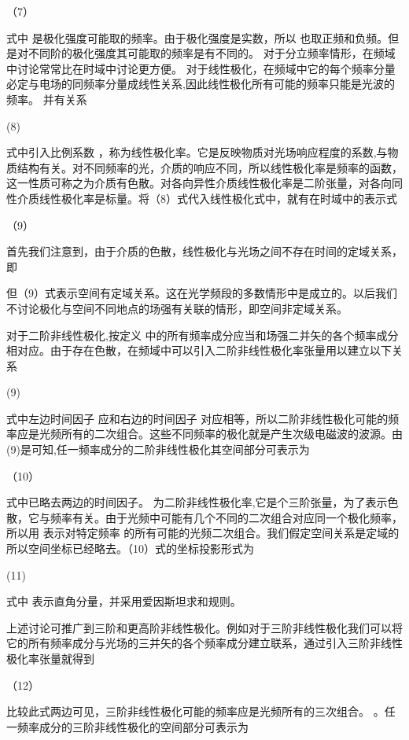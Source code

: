                  （7）

式中 是极化强度可能取的频率。由于极化强度是实数，所以 也取正频和负频。但是对不同阶的极化强度其可能取的频率是有不同的。
      对于分立频率情形，在频域中讨论常常比在时域中讨论更方便。
对于线性极化，在频域中它的每个频率分量必定与电场的同频率分量成线性关系,因此线性极化所有可能的频率只能是光波的频率。 并有关系

                          (8)                 

式中引入比例系数 ，称为线性极化率。它是反映物质对光场响应程度的系数,与物质结构有关。对不同频率的光，介质的响应不同，所以线性极化率是频率的函数，这一性质可称之为介质有色散。对各向异性介质线性极化率是二阶张量，对各向同性介质线性极化率是标量。将（8）式代入线性极化式中，就有在时域中的表示式

                              （9）

首先我们注意到，由于介质的色散，线性极化与光场之间不存在时间的定域关系，即
            
但（9）式表示空间有定域关系。这在光学频段的多数情形中是成立的。以后我们不讨论极化与空间不同地点的场强有关联的情形，即空间非定域关系。

对于二阶非线性极化,按定义 中的所有频率成分应当和场强二并矢的各个频率成分相对应。由于存在色散，在频域中可以引入二阶非线性极化率张量用以建立以下关系

        (9) 

式中左边时间因子 应和右边的时间因子 对应相等，所以二阶非线性极化可能的频率应是光频所有的二次组合。这些不同频率的极化就是产生次级电磁波的波源。由(9)是可知,任一频率成分的二阶非线性极化其空间部分可表示为

                             （10）

式中已略去两边的时间因子。 为二阶非线性极化率,它是个三阶张量，为了表示色散，它与频率有关。由于光频中可能有几个不同的二次组合对应同一个极化频率，所以用 表示对特定频率 的所有可能的光频二次组合。我们假定空间关系是定域的所以空间坐标已经略去。（10）式的坐标投影形式为

                 (11) 

式中 表示直角分量，并采用爱因斯坦求和规则。

上述讨论可推广到三阶和更高阶非线性极化。例如对于三阶非线性极化我们可以将它的所有频率成分与光场的三并矢的各个频率成分建立联系，通过引入三阶非线性极化率张量就得到

                      （12）

比较此式两边可见，三阶非线性极化可能的频率应是光频所有的三次组合。 。任一频率成分的三阶非线性极化的空间部分可表示为

